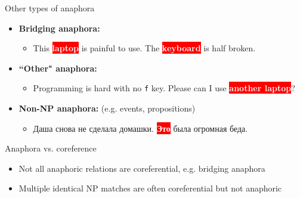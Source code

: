 \documentclass[dvipsnames, 10pt, compress]{beamer}
\newcommand{\redfillbox}[1]{\colorbox{red}{\textcolor{white}{{\bf #1}}}}
\begin{document}
\begin{frame}{Other types of anaphora}

\begin{itemize}
  \item \textbf{Bridging anaphora:} 
  \begin{itemize}
    \item This \redfillbox{laptop} is painful to use. The \redfillbox{keyboard} is half broken.
  \end{itemize}
  \item \textbf{``Other" anaphora:}
  \begin{itemize}
    \item Programming is hard with no {\tt f} key. Please can I use \redfillbox{another laptop}?
  \end{itemize}
  \item \textbf{Non-NP anaphora:} (e.g. events, propositions)
  \begin{itemize}
    \item Даша снова не сделала домашки. \redfillbox{Это} была огромная беда.
  \end{itemize}
\end{itemize}

\end{frame}


\begin{frame}{Anaphora vs. coreference}

\begin{itemize}
  \item Not all anaphoric relations are coreferential, e.g. bridging anaphora
  \item Multiple identical NP matches are often coreferential but not anaphoric
\end{itemize}

\end{frame}

\end{document}
